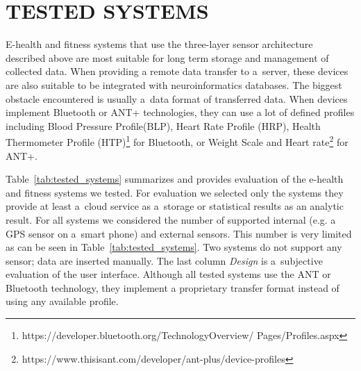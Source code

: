\documentclass[a4paper,twoside]{article}
\begin{document}
\section{\uppercase{Tested systems}}
\label{tested_systems}
\noindent

E-health and fitness systems that use the three-layer sensor architecture described above are most suitable for long term storage and management of collected data. When providing a remote data transfer to a~server, these devices are also suitable to be integrated with neuroinformatics databases. The biggest obstacle encountered is usually a~data format of transferred data. When devices implement Bluetooth or ANT+ technologies, they can use a lot of defined profiles including Blood Pressure Profile(BLP), Heart Rate Profile (HRP), Health Thermometer Profile (HTP)\footnote{https://developer.bluetooth.org/TechnologyOverview/ Pages/Profiles.aspx} for Bluetooth, or Weight Scale and Heart rate\footnote{https://www.thisisant.com/developer/ant-plus/device-profiles} for ANT+.

Table~\ref{tab:tested_systems} summarizes and provides evaluation of the e-health and fitness systems we tested. For evaluation we selected only the systems they provide at least a~cloud service as a~storage or statistical results as an analytic result. For all systems we considered the number of supported internal (e.g. a GPS sensor on a~smart phone) and external sensors. This number is very limited as can be seen in Table~\ref{tab:tested_systems}. Two systems do not support any sensor; data are inserted manually. The last column \emph{Design} is a~subjective evaluation of the user interface. Although all tested systems use the ANT or Bluetooth technology, they implement a proprietary transfer format instead of using any available profile.
\end{document}
